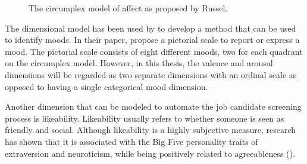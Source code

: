 \begin{figure}[h]
  \centering
  
  \caption{The circumplex model of affect as proposed by Russel.}
  \label{fig:circumplexrussel}
\end{figure}

The dimensional model has been used by \textcite{desmet2016mood} to develop a method that can be used to identify moods. In their paper, \citeauthor{desmet2016mood} propose a pictorial scale to report or express a mood. The pictorial scale consists of eight different moods, two for each quadrant on the circumplex model. However, in this thesis, the valence and arousal dimensions will be regarded as two separate dimensions with an ordinal scale as opposed to having a single categorical mood dimension.

Another dimension that can be modeled to automate the job candidate screening process is likeability. Likeability usually refers to whether someone is seen as friendly and social. Although likeability is a highly subjective measure, research has shown that it is associated with the Big Five personality traits of extraversion and neuroticism, while being positively related to agreeableness (\cite{van2010classroom}). 
